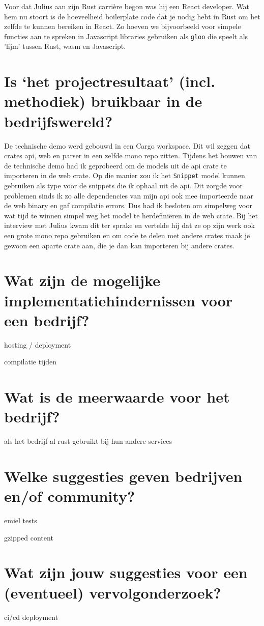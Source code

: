 Voor dat Julius aan zijn Rust carrière begon was hij een React developer. Wat hem nu stoort is de
hoeveelheid boilerplate code dat je nodig hebt in Rust om het zelfde te kunnen bereiken in React.
Zo hoeven we bijvoorbeeld voor simpele functies aan te spreken in Javascript libraries gebruiken als
\texttt{gloo} die speelt als 'lijm' tussen Rust, wasm en Javascript.

\clearpage

\section{Is ‘het projectresultaat’ (incl. methodiek) bruikbaar in de bedrijfswereld?}

De technische demo werd gebouwd in een Cargo workspace. Dit wil zeggen dat crates api, web en parser
in een zelfde mono repo zitten. Tijdens het bouwen van de technische demo had ik geprobeerd om de
models uit de api crate te importeren in de web crate. Op die manier zou ik het
\texttt{Snippet} model kunnen gebruiken als type voor de snippets die ik ophaal uit de
api. Dit zorgde voor problemen sinds ik zo alle dependencies van mijn api ook mee importeerde naar
de web binary en gaf compilatie errors. Dus had ik besloten om simpelweg voor wat tijd te winnen
simpel weg het model te herdefiniëren in de web crate. Bij het interview met Julius kwam dit ter
sprake en vertelde hij dat ze op zijn werk ook een grote mono repo gebruiken en om code te delen met
andere crates maak je gewoon een aparte crate aan, die je dan kan importeren bij andere crates.


\section{Wat zijn de mogelijke implementatiehindernissen voor een bedrijf?}

hosting / deployment

compilatie tijden

\section{Wat is de meerwaarde voor het bedrijf?}

als het bedrijf al rust gebruikt bij hun andere services

\section{Welke suggesties geven bedrijven en/of community?}

emiel
tests

gzipped content

\section{Wat zijn jouw suggesties voor een (eventueel) vervolgonderzoek?}

ci/cd deployment

